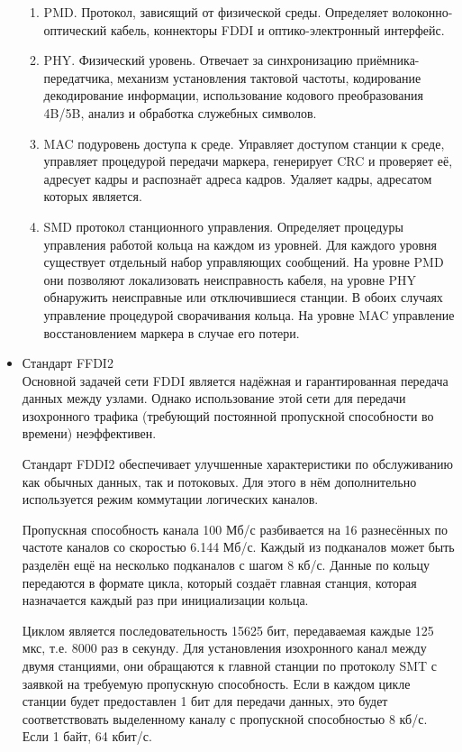 \documentclass[12pt, russian, oneside, article]{ncc}
\begin{document}
\begin{itemize}
\begin{enumerate}
\item PMD. Протокол, зависящий от физической среды. Определяет волоконно-оптический кабель, коннекторы FDDI и оптико-электронный интерфейс.
\item PHY. Физический уровень. Отвечает за синхронизацию приёмника-передатчика, механизм установления тактовой частоты, кодирование декодирование информации, использование кодового преобразования 4B/5B, анализ и обработка служебных символов.
\item MAC подуровень доступа к среде. Управляет доступом станции к среде, управляет процедурой передачи маркера, генерирует CRC и проверяет её, адресует кадры и распознаёт адреса кадров. Удаляет кадры, адресатом которых является.
\item SMD протокол станционного управления. Определяет процедуры управления работой кольца на каждом из уровней. Для каждого уровня существует отдельный набор управляющих сообщений. На уровне PMD они позволяют локализовать неисправность кабеля, на уровне PHY обнаружить неисправные или отключившиеся станции. В обоих случаях управление процедурой сворачивания кольца. На уровне MAC управление восстановлением маркера в случае его потери.
\end{enumerate}


\item Стандарт FFDI2\\
\label{sec-5_2_2_5}%
Основной задачей сети FDDI является надёжная и гарантированная передача данных между узлами. Однако использование этой сети для передачи изохронного трафика (требующий постоянной пропускной способности во времени) неэффективен.

Стандарт FDDI2 обеспечивает улучшенные характеристики по обслуживанию как обычных данных, так и потоковых. Для этого в нём дополнительно используется режим коммутации логических каналов.

Пропускная способность канала 100 Мб/с разбивается на 16 разнесённых по частоте каналов со скоростью 6.144 Мб/с. Каждый из подканалов может быть разделён ещё на несколько подканалов с шагом 8 кб/с. Данные по кольцу передаются в формате цикла, который создаёт главная станция, которая назначается каждый раз при инициализации кольца.

Циклом является последовательность 15625  бит, передаваемая каждые 125 мкс, т.е. 8000 раз в секунду. Для установления изохронного канал между двумя станциями, они обращаются к главной станции по протоколу SMT с заявкой на требуемую пропускную способность. Если в каждом цикле станции будет предоставлен 1 бит для передачи данных, это будет соответствовать выделенному каналу с пропускной способностью 8 кб/с. Если 1 байт, 64 кбит/с.

\end{itemize} %
\end{document}

